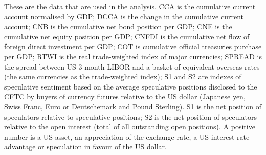 \documentclass[12pt, a4paper, oneside]{article}\usepackage[]{graphicx}\usepackage[]{color}
\begin{document}
\begin{landscape}
\begin{table}[t]
\begin{threeparttable}
\begin{tablenotes}
\item These are the data that are used in the analysis.   CCA is the cumulative current account normalised by GDP; DCCA is the change in the cumulative current account; CNB is the cumulative net bond position per GDP; CNE is the cumulative net equity position per GDP; CNFDI is the cumulative net flow of foreign direct investment per GDP; COT is cumulative official treasuries purchase per GDP; RTWI is the real trade-weighted index of major currencies; SPREAD is the spread between US 3 month LIBOR and a basket of equivalent overseas rates (the same currencies as the trade-weighted index); S1 and S2 are indexes of speculative sentiment based on the average speculative positions disclosed to the CFTC by buyers of currency futures relative to the US dollar (Japanese yen, Swiss Franc, Euro or Deutschemark and Pound Sterling).  S1 is the net position of speculators relative to speculative positions; S2 is the net position of speculators relative to the open interest (total of all outstanding open positions).  A positive number is a US asset, an appreciation of the exchange rate, a US interest rate advantage or speculation in favour of the US dollar. 
\end{tablenotes}
\end{threeparttable}  
\end{table}
\end{landscape}
\end{document}

